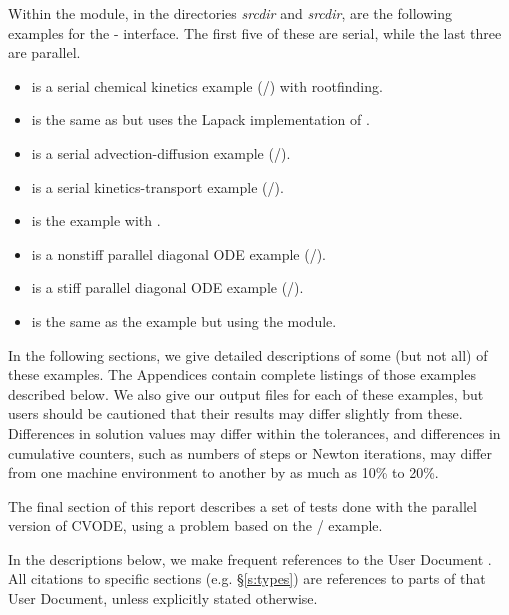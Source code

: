 \vspace{0.2in}\noindent
Within the {\fcvode} module, in the directories 
{\em srcdir} and
{\em srcdir}, are the following examples for
the {\F}-{\C} interface.  The first five of these are serial, while
the last three are parallel.
\begin{itemize}
\item {} is a serial chemical kinetics example (/{\cvdense})
  with rootfinding.
\item {} is the same as  but uses the Lapack
  implementation of {\cvdense}.
\item {} is a serial advection-diffusion example (/{\cvband}).
\item {} is a serial kinetics-transport example (/{\cvspgmr}).
\item {} is the  example with {\fcvbp}.
\item {} is a nonstiff parallel diagonal ODE example
  (/).
\item {} is a stiff parallel diagonal ODE example (/{\cvspgmr}).
\item {} is the same as the  example
       but using the {\fcvbbd} module.
\end{itemize}

\vspace{0.2in}\noindent
In the following sections, we give detailed descriptions of some (but
not all) of these examples.  The Appendices contain complete listings
of those examples described below.  We also give our output files for
each of these examples, but users should be cautioned that their
results may differ slightly from these.  Differences in solution
values may differ within the tolerances, and differences in cumulative
counters, such as numbers of steps or Newton iterations, may differ
from one machine environment to another by as much as 10\% to 20\%.

The final section of this report describes a set of tests done with the
parallel version of CVODE, using a problem based on the
/ example.

In the descriptions below, we make frequent references to the {\cvode}
User Document \cite{cvode_ug}.  All citations to specific sections
(e.g. \S\ref{s:types}) are references to parts of that User Document, unless
explicitly stated otherwise.

